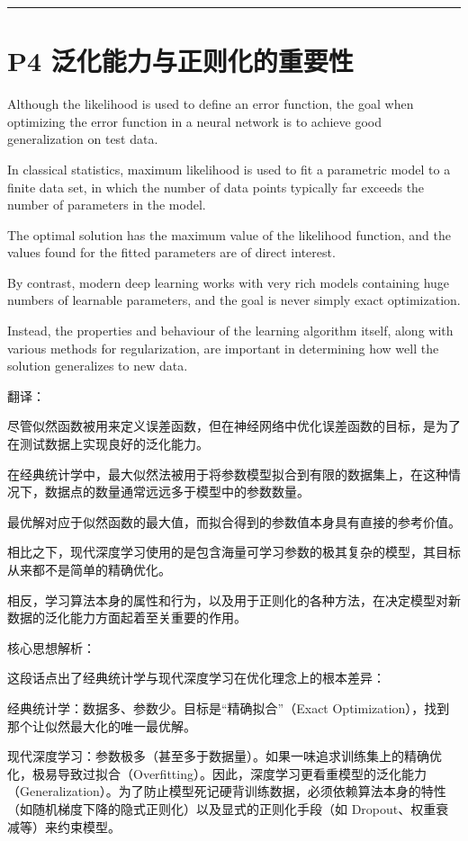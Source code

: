 \documentclass{article}
\begin{document}
\noindent\rule{\linewidth}{0.4pt}

\section{P4 泛化能力与正则化的重要性}

Although the likelihood is used to define an error function, the goal when optimizing the error function in a neural network is to achieve good generalization on test data. 

In classical statistics, maximum likelihood is used to fit a parametric model to a finite data set, in which the number of data points typically far exceeds the number of parameters in the model. 

The optimal solution has the maximum value of the likelihood function, and the values found for the fitted parameters are of direct interest. 

By contrast, modern deep learning works with very rich models containing huge numbers of learnable parameters, and the goal is never simply exact optimization. 

Instead, the properties and behaviour of the learning algorithm itself, along with various methods for regularization, are important in determining how well the solution generalizes to new data.

{\color{red}
翻译：

尽管似然函数被用来定义误差函数，但在神经网络中优化误差函数的目标，是为了在测试数据上实现良好的泛化能力。

在经典统计学中，最大似然法被用于将参数模型拟合到有限的数据集上，在这种情况下，数据点的数量通常远远多于模型中的参数数量。

最优解对应于似然函数的最大值，而拟合得到的参数值本身具有直接的参考价值。

相比之下，现代深度学习使用的是包含海量可学习参数的极其复杂的模型，其目标从来都不是简单的精确优化。

相反，学习算法本身的属性和行为，以及用于正则化的各种方法，在决定模型对新数据的泛化能力方面起着至关重要的作用。
}

{\color{blue}
核心思想解析：

这段话点出了经典统计学与现代深度学习在优化理念上的根本差异：

经典统计学：数据多、参数少。目标是“精确拟合”（Exact Optimization），找到那个让似然最大化的唯一最优解。

现代深度学习：参数极多（甚至多于数据量）。如果一味追求训练集上的精确优化，极易导致过拟合（Overfitting）。因此，深度学习更看重模型的泛化能力（Generalization）。为了防止模型死记硬背训练数据，必须依赖算法本身的特性（如随机梯度下降的隐式正则化）以及显式的正则化手段（如 Dropout、权重衰减等）来约束模型。


}
\end{document}
